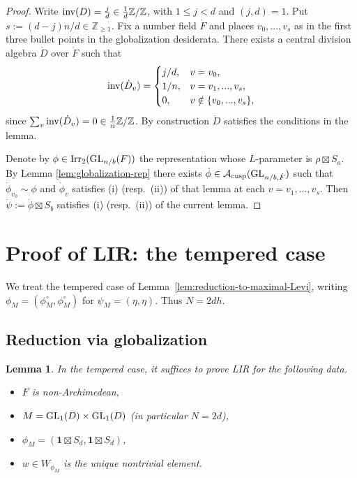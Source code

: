 \documentclass[11pt,reqno]{amsart}
\theoremstyle{plain}
\newtheorem{lem}[thm]{Lemma}
\theoremstyle{definition}
\newcommand{\Z}{\mathbb{Z}}
\newcommand{\cA}{\mathcal{A}}
\newcommand{\GL}{\tu{GL}}
\newcommand{\triv}{{\mathbf{1}}}
\newcommand{\Irr}{\tu{Irr}}
\newcommand{\tu}{\textup}
\numberwithin{equation}{subsection}
\begin{document}
\begin{proof}
Write $\tu{inv}(D)=\tfrac{j}{d}\in \tfrac{1}{d}\Z/\Z$, with $1 \leq j < d$ and $(j,d)=1$. Put $s:=(d-j)n/d\in \Z_{\ge 1}$. Fix a number field $\dot F$ and places $v_0,...,v_s$ as in the first three bullet points in the globalization desiderata.
  There exists a central division algebra $\dot D$ over $\dot F$ such that 
\[
\tu{inv}(\dot D_{v})=\begin{cases}
j/d, & v=v_0,\\
1/n, & v=v_1,...,v_s,\\
0, & v\notin \{v_0,...,v_s\},
\end{cases}
\]
since $\sum_{v}\tu{inv}(\dot D_v)=0\in \tfrac{1}{n}\Z/\Z$. By construction $\dot D$ satisfies the conditions in the lemma.

Denote by $\phi\in \Irr_2(\GL_{n/b}(F))$ the representation whose $L$-parameter is $\rho\boxtimes S_a$. By Lemma \ref{lem:globalization-rep} there exists $\dot\phi\in \cA_{\tu{cusp}}(\GL_{n/b,\dot F})$ such that $\dot \phi_{v_0}\sim \phi$ and $\dot \phi_{v}$ satisfies (i) (resp.~(ii)) of that lemma at each $v=v_1,...,v_s$. 
Then $\dot \psi:=\dot\phi\boxtimes S_b$ satisfies (i) (resp.~(ii)) of the current lemma. 
\end{proof}


\section{Proof of LIR: the tempered case}\label{s:proof-tempered}

We treat the tempered case of Lemma~\ref{lem:reduction-to-maximal-Levi},
writing $\phi_M=(\phi_M^\circ,\phi_M^\circ)$ for $\psi_M=(\eta,\eta)$. Thus $N=2dh$.

\subsection{Reduction via globalization}

\begin{lem}\label{lem:reduction-tempered}
In the tempered case, it suffices to prove LIR for the following data.
\begin{itemize}
\item $F$ is non-Archimedean,
    \item $M=\GL_1(D)\times \GL_1(D)$ (in particular $N=2d$),
    \item $\phi_M=(\triv\boxtimes S_d,\triv\boxtimes S_d)$,
    \item $w\in W_{\phi_M}$ is the unique nontrivial element.
\end{itemize}
\end{lem}
\end{document}
